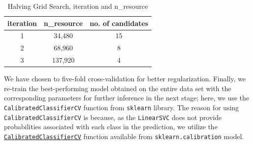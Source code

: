 \documentclass[11pt]{article}
\begin{document}
\begin{table}
    \centering
    \small
    \begin{tabular}{c c c}
    \hline 
      \textbf{iteration}   & \textbf{n\_resource}  & \textbf{no. of candidates} \\ \hline 
        1 & 34,480 & 15\\
        2 & 68,960 & 8\\
        3 & 137,920 & 4\\\hline     
    \end{tabular}
    \caption{Halving Grid Search, iteration and n\_resource}
    \label{tab:my_label}
\end{table}

We have chosen to five-fold cross-validation for better regularization. Finally, we re-train the best-performing model obtained on the entire data set with the corresponding parameters for further inference in the next stage; here, we use the \texttt{CalibratedClassifierCV} function from \texttt{sklearn} library. The reason for using \texttt{CalibratedClassifierCV} is because, as the \texttt{LinearSVC} does not provide probabilities associated with each class in the prediction, we utilize the \href{https://scikit-learn.org/stable/modules/generated/sklearn.calibration.CalibratedClassifierCV.html#sklearn.calibration.CalibratedClassifierCV}{\texttt{CalibratedClassifierCV}} function available from \texttt{sklearn.calibration} model.
\end{document}

